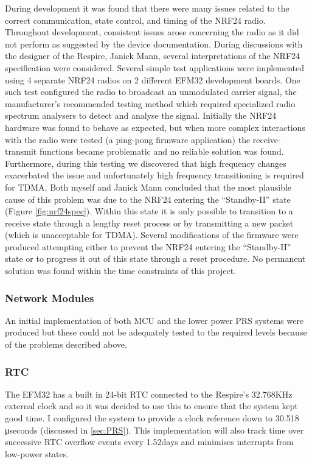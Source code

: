 During development it was found that there were many issues related to the correct
communication, state control, and timing of the \ac{NRF24} radio. Throughout development, consistent
issues arose concerning the radio as it did not perform as suggested by the device documentation.
During discussions with the designer of the Respire, Janick Mann, several interpretations of the
NRF24 specification were considered. Several simple test applications were implemented using 4
separate \ac{NRF24} radios on 2 different EFM32 development boards. One such test configured the
radio to broadcast an unmodulated carrier signal, the manufacturer's recommended testing
method which required specialized radio spectrum analysers
to detect and analyse the signal. Initially the \ac{NRF24} hardware was found to behave as expected, but
when more complex interactions with the radio were tested (\eg a ping-pong firmware application)
the receive-transmit functions became problematic and no reliable solution was found.
Furthermore, during this testing we discovered that high frequency changes exacerbated the issue
and unfortunately high frequency transitioning is required for \ac{TDMA}. Both myself and Janick Mann
concluded that the most plausible cause of this problem was due to the \ac{NRF24} entering the
``Standby-II'' state (Figure \ref{fig:nrf24spec}). Within this state it is only possible to transition to a receive state through a
lengthy reset process or by transmitting a new packet (which is unacceptable for \ac{TDMA}). Several
modifications of the firmware were produced attempting either to prevent the \ac{NRF24} entering the
``Standby-II'' state or to progress it out of this state through a reset procedure. No permanent
solution was found within the time constraints of this project.


\subsubsection{Network Modules}
An initial implementation of both \ac{MCU} and the lower power \ac{PRS} systems were produced but these
could not be adequately tested to the required levels because of the problems described above.


\subsubsection{\acf{RTC}}
The EFM32 has a built in 24-bit \ac{RTC} connected to the Respire's 32.768KHz external
clock and so it was decided to use this to ensure that the system kept good time. I configured the
system to provide a clock reference down to 30.518 μseconds (discussed in \ref{sec:PRS}). This
implementation will also track time over successive RTC overflow events every 1.52days and
minimises interrupts from low-power states.

